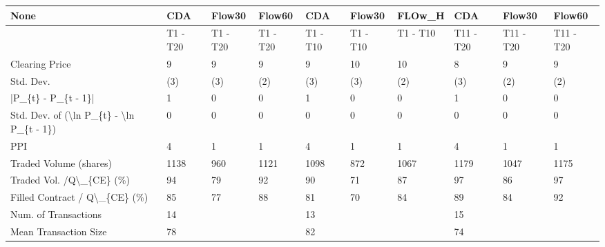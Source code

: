 \begin{tabular}{llllllllll}
\hline
 None                                                      & CDA      & Flow30   & Flow60   & CDA      & Flow30   & FLOw\_H   & CDA       & Flow30    & Flow60    \\
\hline
                                                           & T1 - T20 & T1 - T20 & T1 - T20 & T1 - T10 & T1 - T10 & T1 - T10 & T11 - T20 & T11 - T20 & T11 - T20 \\
 Clearing Price                                            & 9        & 9        & 9        & 9        & 10       & 10       & 8         & 9         & 9         \\
 Std. Dev.                                                 & (3)      & (3)      & (2)      & (3)      & (3)      & (2)      & (3)       & (2)       & (2)       \\
 |P\_\{t\} - P\_\{t - 1\}|                                       & 1        & 0        & 0        & 1        & 0        & 0        & 1         & 0         & 0         \\
 Std. Dev. of (\textbackslash{}ln P\_\{t\} - \textbackslash{}ln P\_\{t - 1\})                  & 0        & 0        & 0        & 0        & 0        & 0        & 0         & 0         & 0         \\
 PPI                                                       & 4        & 1        & 1        & 4        & 1        & 1        & 4         & 1         & 1         \\
 Traded Volume (shares)                                    & 1138     & 960      & 1121     & 1098     & 872      & 1067     & 1179      & 1047      & 1175      \\
 Traded Vol. /Q\textbackslash{}\_\{CE\} (\%)                                  & 94       & 79       & 92       & 90       & 71       & 87       & 97        & 86        & 97        \\
 Filled Contract / Q\textbackslash{}\_\{CE\} (\%)                             & 85       & 77       & 88       & 81       & 70       & 84       & 89        & 84        & 92        \\
 Num. of Transactions                                      & 14       &          &          & 13       &          &          & 15        &           &           \\
 Mean Transaction Size                                     & 78       &          &          & 82       &          &          & 74        &           &           \\

\end{tabular}
